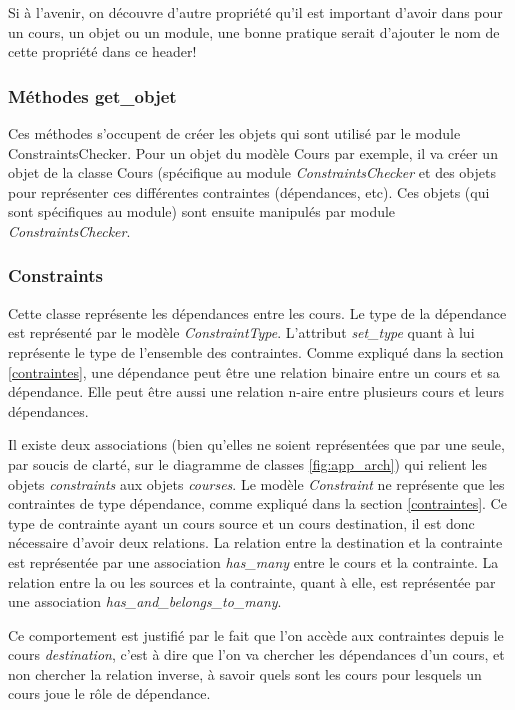Si à l'avenir, on découvre d'autre propriété qu'il est important d'avoir dans pour un cours, un objet ou un module, une bonne pratique serait d'ajouter le nom de cette propriété dans ce header!

\subsubsection{Méthodes get\_objet}
Ces méthodes s'occupent de créer les objets qui sont utilisé par le module ConstraintsChecker. Pour un objet du modèle Cours par exemple, il va créer un objet de la classe Cours (spécifique au module \textit{ConstraintsChecker} et des objets pour représenter ces différentes contraintes (dépendances, etc). Ces objets (qui sont spécifiques au module) sont ensuite manipulés par module \textit{ConstraintsChecker}.

\subsubsection{Constraints}
Cette classe représente les dépendances entre les cours. Le type de la dépendance est représenté par le modèle \textit{ConstraintType}. L'attribut \textit{set\_type} quant à lui représente le type de l'ensemble des contraintes. Comme expliqué dans la section \ref{contraintes}, une dépendance peut être une relation binaire entre un cours et sa dépendance. Elle peut être aussi une relation n-aire entre plusieurs cours et leurs dépendances.

Il existe deux associations (bien qu'elles ne soient représentées que par une seule, par soucis de clarté, sur le diagramme de classes \ref{fig:app_arch}) qui relient les objets \textit{constraints} aux objets \textit{courses}. Le modèle \textit{Constraint} ne représente que les contraintes de type dépendance, comme expliqué dans la section \ref{contraintes}. Ce type de contrainte ayant un cours source et un cours destination, il est donc nécessaire d'avoir deux relations.  La relation entre la destination et la contrainte est représentée par une association \textit{has\_many} entre le cours et la contrainte. La relation entre la ou les sources et la contrainte, quant à elle, est représentée par une association \textit{has\_and\_belongs\_to\_many}. 

Ce comportement est justifié par le fait que l'on accède aux contraintes depuis le cours \textit{destination}, c'est à dire que l'on va chercher les dépendances d'un cours, et non chercher la relation inverse, à savoir quels sont les cours pour lesquels un cours joue le rôle de dépendance.

